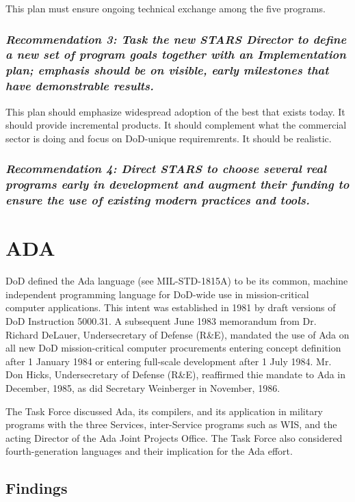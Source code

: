 \documentclass[12pt]{article}
\begin{document}
This plan must ensure ongoing technical exchange among the five programs.

\subsubsection*{\textit{Recommendation 3: Task the new STARS Director to define a new set of
program goals together with an Implementation plan; emphasis should be on
visible, early milestones that have demonstrable results.}}

This plan should emphasize widespread adoption of the best that exists today.
It should provide incremental products. It should complement what the
commercial sector is doing and focus on DoD-unique requiremrents. It should be
realistic.

\subsubsection*{\textit{Recommendation 4: Direct STARS to choose several real
programs early in development and augment their funding to ensure the use of
existing modern practices and tools.}}

\section{ADA}

DoD defined the Ada language (see MIL-STD-1815A) to be its common,
machine independent programming language for DoD-wide use in mission-critical
computer applications. This intent was established in 1981 by draft versions of
DoD Instruction 5000.31. A subsequent June 1983 memorandum from Dr. Richard
DeLauer, Undersecretary of Defense (R\&E), mandated the use of Ada on all new
DoD mission-critical computer procurements entering concept definition after 1
January 1984 or entering full-scale development after 1 July 1984. Mr. Don
Hicks, Undersecretary of Defense (R\&E), reaffirmed thie mandate to Ada in
December, 1985, as did Secretary Weinberger in November, 1986.

The Task Force discussed Ada, its compilers, and its application in military
programs with the three Services, inter-Service programs such as WIS, and the
acting Director of the Ada Joint Projects Office. The Task Force also
considered fourth-generation languages and their implication for the Ada
effort.

\subsection*{Findings}
\end{document}
